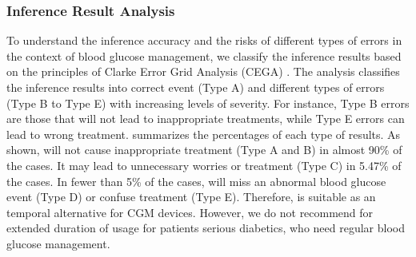 \subsubsection{Inference Result Analysis}
\label{subsec:predict_result_analysis}
To understand the inference accuracy and the risks of different types of errors in the context of blood glucose management, we classify the inference results based on the principles of Clarke Error Grid Analysis (CEGA) \cite{bib:DTT05:Clarke}.
The analysis classifies the inference results into correct event (Type A) and different types of errors (Type B to Type E) with increasing levels of severity.
For instance, Type B errors are those that will not lead to inappropriate treatments, while Type E errors can lead to wrong treatment.
 summarizes the percentages of each type of results.
As shown, \sysname will not cause inappropriate treatment (Type A and B) in almost 90\% of the cases.
It may lead to unnecessary worries or treatment (Type C) in 5.47\% of the cases.
In fewer than 5\% of the cases, \sysname will miss an abnormal blood glucose event (Type D) or confuse treatment (Type E).
Therefore, \sysname is suitable as an temporal alternative for CGM devices.
However, we do not recommend \sysname for extended duration of usage for patients serious diabetics, who need regular blood glucose management.

